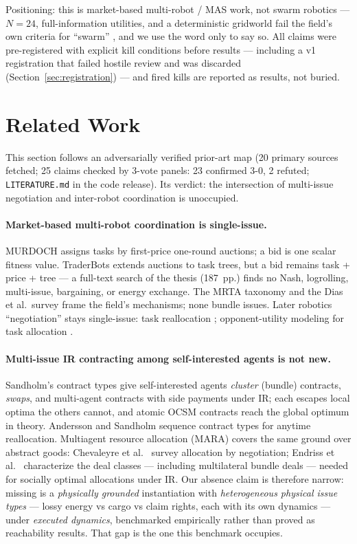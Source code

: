 \documentclass[sigconf,nonacm]{acmart}
\begin{document}
Positioning: this is market-based multi-robot / MAS work, not swarm
robotics --- $N{=}24$, full-information utilities, and a deterministic
gridworld fail the field's own criteria for ``swarm'' \cite{sahin2005swarm},
and we use the word only to say so. All claims were pre-registered with
explicit kill conditions before results --- including a v1 registration
that failed hostile review and was discarded
(Section~\ref{sec:registration}) --- and fired kills are reported as
results, not buried.

\section{Related Work}\label{sec:related}

This section follows an adversarially verified prior-art map (20 primary
sources fetched; 25 claims checked by 3-vote panels: 23 confirmed 3-0, 2
refuted; \texttt{LITERATURE.md} in the code release). Its verdict: the
intersection of multi-issue negotiation and inter-robot coordination is
unoccupied.

\paragraph{Market-based multi-robot coordination is single-issue.}
MURDOCH \cite{gerkey2002murdoch} assigns tasks by first-price one-round
auctions; a bid is one scalar fitness value. TraderBots
\cite{zlot2006auction} extends auctions to task trees, but a bid remains
task + price + tree --- a full-text search of the thesis (187~pp.) finds no
Nash, logrolling, multi-issue, bargaining, or energy exchange. The MRTA
taxonomy \cite{gerkey2004taxonomy} and the Dias et al.\ survey
\cite{dias2006market} frame the field's mechanisms; none bundle issues.
Later robotics ``negotiation'' stays single-issue: task reallocation
\cite{cui2013game}; opponent-utility modeling for task allocation
\cite{ke2012task}.

\paragraph{Multi-issue IR contracting among self-interested agents is not
new.} Sandholm's contract types \cite{sandholm1998contract} give
self-interested agents \emph{cluster} (bundle) contracts, \emph{swaps}, and
multi-agent contracts with side payments under IR; each escapes local
optima the others cannot, and atomic OCSM contracts reach the global
optimum in theory. Andersson and Sandholm \cite{andersson1999sequencing}
sequence contract types for anytime reallocation. Multiagent resource
allocation (MARA) covers the same ground over abstract goods: Chevaleyre et
al.\ \cite{chevaleyre2006mara} survey allocation by negotiation; Endriss et
al.\ \cite{endriss2006negotiating} characterize the deal classes ---
including multilateral bundle deals --- needed for socially optimal
allocations under IR. Our absence claim is therefore narrow: missing is a
\emph{physically grounded} instantiation with \emph{heterogeneous physical
issue types} --- lossy energy vs cargo vs claim rights, each with its own
dynamics --- under \emph{executed dynamics}, benchmarked empirically rather
than proved as reachability results. That gap is the one this benchmark
occupies.
\end{document}

